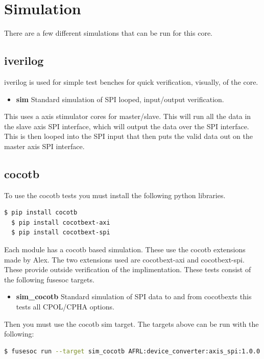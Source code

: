 \newpage

\section{Simulation}
\par
There are a few different simulations that can be run for this core.

\subsection{iverilog}
\par
iverilog is used for simple test benches for quick verification, visually, of the core.
\begin{itemize}
  \item \textbf{sim} Standard simulation of SPI looped, input/output verification.
\end{itemize}

This uses a axis stimulator cores for master/slave. This will run all the data in the slave axis SPI interface, which
will output the data over the SPI interface. This is then looped into the SPI input that then puts the valid data out
on the master axis SPI interface.

\subsection{cocotb}
\par
To use the cocotb tests you must install the following python libraries.
\begin{lstlisting}[language=bash]
  $ pip install cocotb
  $ pip install cocotbext-axi
  $ pip install cocotbext-spi
\end{lstlisting}

Each module has a cocotb based simulation. These use the cocotb extensions made by Alex.
The two extensions used are cocotbext-axi and cocotbext-spi. These provide outside verification
of the implimentation. These tests consist of the following fusesoc targets.

\begin{itemize}
  \item \textbf{sim\_cocotb} Standard simulation of SPI data to and from cocotbexts this tests all CPOL/CPHA options.
\end{itemize}

Then you must use the cocotb sim target. The targets above can be run with the following:
\begin{lstlisting}[language=bash]
  $ fusesoc run --target sim_cocotb AFRL:device_converter:axis_spi:1.0.0
\end{lstlisting}

